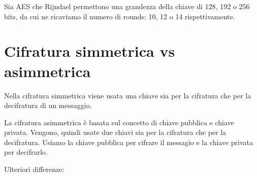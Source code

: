 \textsf{\small Sia AES che Rijndael permettono una grandezza della chiave di 128, 192 o 256 bits, da cui ne ricaviamo il numero di rounds: 10, 12 o 14 rispettivamente.}

\section{Cifratura simmetrica vs asimmetrica} %

 

\textsf{\small Nella cifratura simmetrica viene usata una chiave sia per la cifratura che per la decifratura di un messaggio.}

 

\textsf{\small La cifratura asimmetrica è basata sul concetto di chiave pubblica e chiave privata. Vengono, quindi usate due chiavi sia per la cifratura che per la decifratura. Usiamo la chiave pubblica per cifrare il messagio e la chiave privata per decifrarlo.} %

\textsf{\small Ulteriori differenze: }

           

